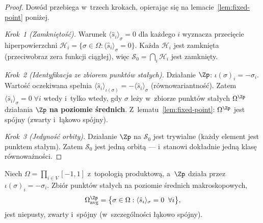 \begin{proof}
Dow\'od przebiega w~trzech krokach, opieraj\k{a}c si\k{e}
na lemacie~\ref{lem:fixed-point} poni\.zej.

\emph{Krok~1 (Zamkni\k{e}to\'s\'c).}
Warunek $\langle\hat{s}_i\rangle_\sigma = 0$ dla ka\.zdego $i$
wyznacza przeci\k{e}cie hiperpowierzchni
$\mathcal{H}_i = \{\sigma\in\Omega : \langle\hat{s}_i\rangle_\sigma=0\}$.
Ka\.zda $\mathcal{H}_i$ jest zamkni\k{e}ta (przeciwobraz zera
funkcji ci\k{a}g\l{}ej), wi\k{e}c
$\mathcal{S}_0 = \bigcap_i \mathcal{H}_i$ jest zamkni\k{e}ty.

\emph{Krok~2 (Identyfikacja ze zbiorem punkt\'ow sta\l{}ych).}
Dzia\l{}anie $\Zp$: $\iota(\sigma)_i = -\sigma_i$.
Warto\'s\'c oczekiwana spe\l{}nia $\langle\hat{s}_i\rangle_{\iota(\sigma)}
= -\langle\hat{s}_i\rangle_\sigma$ (r\'ownowariantno\'s\'c).
Zatem $\langle\hat{s}_i\rangle_\sigma = 0\;\forall i$ wtedy
i~tylko wtedy, gdy $\sigma$ le\.zy w~zbiorze punkt\'ow sta\l{}ych
$\Omega^{\Zp}$ dzia\l{}ania $\Zp$ \textbf{na poziomie \'srednich}.
Z~lematu~\ref{lem:fixed-point}:
$\Omega^{\Zp}$ jest sp\'ojny (zwarty i~\l{}\k{a}kowo sp\'ojny).

\emph{Krok~3 (Jedyno\'s\'c orbity).}
Dzia\l{}anie $\Zp$ na $\mathcal{S}_0$ jest trywialne
(ka\.zdy element jest punktem sta\l{}ym). Zatem
$\mathcal{S}_0$ jest jedn\k{a} orbit\k{a} --- i~stanowi
dok\l{}adnie jedn\k{a} klas\k{e} r\'ownowa\.zno\'sci.
\end{proof}

\begin{lemma}%
\label{lem:fixed-point}
Niech $\Omega = \prod_{i\in V} [-1,1]$ z~topologi\k{a} produktow\k{a},
a~$\Zp$ dzia\l{}a przez $\iota(\sigma)_i = -\sigma_i$.
Zbi\'or punkt\'ow sta\l{}ych na poziomie \'srednich makroskopowych,
\[
  \Omega^{\Zp}_{\mathrm{avg}}
  = \bigl\{\sigma\in\Omega :
    \langle\hat{s}_i\rangle_\sigma = 0\;\;\forall i\bigr\},
\]
jest niepusty, zwarty i~sp\'ojny (w~szczeg\'olno\'sci
\l{}\k{a}kowo sp\'ojny).
\end{lemma}

